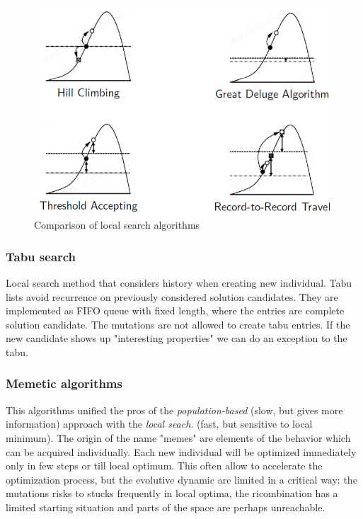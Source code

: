 \documentclass{article}
\begin{document}
\begin{figure}[H]
    \centering
    \includegraphics[scale=0.5]{images/comp_algo.png}
    \caption{Comparison of local search algorithms}
\end{figure}

\subsubsection{Tabu search}
Local search method that considers history when creating new individual. Tabu lists
avoid recurrence on previously considered solution candidates. They are implemented
as FIFO queue with fixed length, where the entries are complete solution candidate. The
mutations are not allowed to create tabu entries. If the new candidate shows up "interesting
properties" we can do an exception to the tabu.

\subsubsection{Memetic algorithms}
This algorithms unified the pros of the \textit{population-based} (slow, but gives more information) approach with the \textit{local seach}.
(fast, but sensitive to local minimum). The origin of the name "memes" are elements of the behavior
which can be acquired individually. Each new individual will be optimized immediately only in few
steps or till local optimum.
\newline\newline
This often allow to accelerate the optimization process, but the evolutive dynamic are limited in a
critical way: the mutations risks to stucks frequently in local optima, the ricombination has a
limited starting situation and parts of the space are perhaps unreachable.
\end{document}
